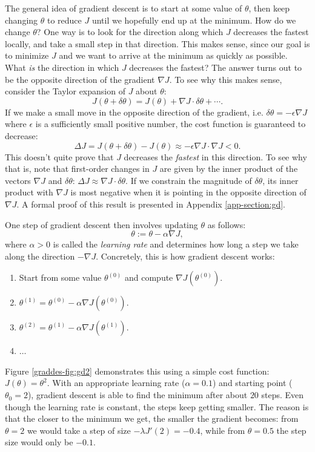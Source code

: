 \documentclass{article}
\theoremstyle{definition}
\begin{document}
The general idea of gradient descent is to start at some value of $\theta$, then keep changing $\theta$ to reduce $J$ until we hopefully end up at the minimum. How do we change $\theta$? One way is to look for the direction along which $J$ decreases the fastest locally, and take a small step in that direction. This makes sense, since our goal is to minimize $J$ and we want to arrive at the minimum as quickly as possible. What \textit{is} the direction in which $J$ decreases the fastest? The answer turns out to be the opposite direction of the gradient $\nabla J$. To see why this makes sense, consider the Taylor expansion of $J$ about $\theta$:
\begin{equation}
    J(\theta + \delta\theta) =  J(\theta) + \nabla J \cdot \delta\theta + \cdots.
\end{equation}
If we make a small move in the opposite direction of the gradient, i.e. $\delta\theta = -\epsilon \nabla J$ where $\epsilon$ is a sufficiently small positive number, the cost function is guaranteed to decrease:
\begin{equation}
   \Delta J = J(\theta + \delta\theta) -  J(\theta) \approx -\epsilon \nabla J \cdot \nabla J < 0.
\end{equation}
This doesn't quite prove that $J$ decreases the \textit{fastest} in this direction. To see why that is, note that first-order changes in $J$ are given by the inner product of the vectors $\nabla J$ and $\delta \theta$: $\Delta J \approx \nabla J \cdot \delta\theta$. If we constrain the magnitude of $\delta \theta$, its inner product with $\nabla J$ is most negative when it is pointing in the opposite direction of $\nabla J$. A formal proof of this result is presented in Appendix \ref{app-section:gd}.

One step of gradient descent then involves updating $\theta$ as follows:
\begin{equation}
    \theta := \theta - \alpha \nabla J,
\end{equation}
where $\alpha > 0$ is called the \textit{learning rate} and determines how long a step we take along the direction $-\nabla J$. Concretely, this is how gradient descent works:
\begin{enumerate}
    \item Start from some value $\theta^{(0)}$ and compute $\nabla J(\theta^{(0)})$.
    \item $\theta^{(1)}=\theta^{(0)}-\alpha\nabla J(\theta^{(0)})$.
    \item $\theta^{(2)}=\theta^{(1)}-\alpha\nabla J(\theta^{(1)})$.
    \item $\dots$
\end{enumerate}
Figure \ref{graddes-fig:gd2} demonstrates this using a simple cost function: $J(\theta)=\theta^2$. With an appropriate learning rate ($\alpha=0.1$) and starting point ($\theta_0=2$), gradient descent is able to find the minimum after about $20$ steps. Even though the learning rate is constant, the steps keep getting smaller. The reason is that the closer to the minimum we get, the smaller the gradient becomes: from $\theta = 2$ we would take a step of size $-\lambda J'(2) = -0.4$, while from $\theta = 0.5$ the step size would only be $-0.1$.
\end{document}

